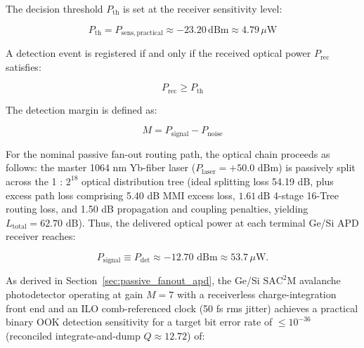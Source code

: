 \documentclass[journal]{IEEEtran}
\begin{document}
\begin{center}
\end{center}

\begin{center}
\end{center}

The decision threshold $P_{\mathrm{th}}$ is set at the receiver sensitivity level:

\begin{equation}
P_{\mathrm{th}} = P_{\mathrm{sens,practical}} \approx -23.20\,\text{dBm} \approx 4.79\,\mu\text{W}
\end{equation}

A detection event is registered if and only if the received optical power $P_{\mathrm{rec}}$ satisfies:

\begin{equation}
P_{\mathrm{rec}} \ge P_{\mathrm{th}}
\end{equation}

The detection margin is defined as:

\begin{equation}
M = P_{\text{signal}} - P_{\text{noise}}
\end{equation}

For the nominal passive fan-out routing path, the optical chain proceeds as follows: the master 1064 nm Yb-fiber laser ($P_{\text{laser}} = +50.0\text{ dBm}$) is passively split across the 1 : $2^{18}$ optical distribution tree (ideal splitting loss 54.19 dB, plus excess path loss comprising 5.40 dB MMI excess loss, $1.61\,\text{dB}$ 4-stage 16-Tree routing loss, and 1.50 dB propagation and coupling penalties, yielding $L_{\text{total}} = 62.70\text{ dB}$). Thus, the delivered optical power at each terminal Ge/Si APD receiver reaches:

\begin{equation}
P_{\text{signal}} \equiv P_{\text{det}} \approx -12.70\text{ dBm} \approx 53.7\,\mu\text{W}.
\end{equation}

As derived in Section~\ref{sec:passive_fanout_apd}, the Ge/Si $\mathrm{SAC^2M}$ avalanche photodetector operating at gain $M = 7$ with a receiverless charge-integration front end and an ILO comb-referenced clock (50 fs rms jitter) achieves a practical binary OOK detection sensitivity for a target bit error rate of $\le 10^{-36}$ (reconciled integrate-and-dump $Q \approx 12.72$) of:
\end{document}
